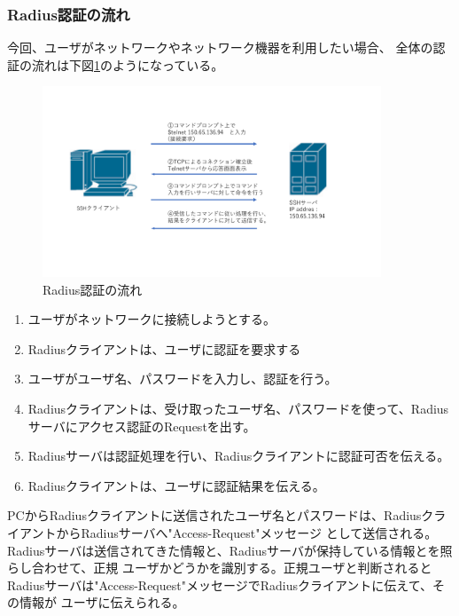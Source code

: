 \documentclass[11pt,a4j,titlepage]{jreport}
\begin{document}
\subsubsection*{Radius認証の流れ}
今回、ユーザがネットワークやネットワーク機器を利用したい場合、
全体の認証の流れは下図\ref{Radius_Authentication}のようになっている。
\begin{figure}[h]
    \begin{center}
        \includegraphics[width=0.9\textwidth, page=19]{graphs/network_archtecture.pdf}
        \caption{Radius認証の流れ}
        \label{Radius_Authentication}
    \end{center}
\end{figure}
\begin{enumerate}
    \setlength{\parskip}{0.1cm} %
    \setlength{\itemsep}{0.1cm} 

    \item ユーザがネットワークに接続しようとする。
    \item Radiusクライアントは、ユーザに認証を要求する
    \item ユーザがユーザ名、パスワードを入力し、認証を行う。
    \item Radiusクライアントは、受け取ったユーザ名、パスワードを使って、Radiusサーバにアクセス認証のRequestを出す。
    \item Radiusサーバは認証処理を行い、Radiusクライアントに認証可否を伝える。
    \item Radiusクライアントは、ユーザに認証結果を伝える。

\end{enumerate}




PCからRadiusクライアントに送信されたユーザ名とパスワードは、RadiusクライアントからRadiusサーバへ"Access-Request"メッセージ
として送信される。Radiusサーバは送信されてきた情報と、Radiusサーバが保持している情報とを照らし合わせて、正規
ユーザかどうかを識別する。正規ユーザと判断されるとRadiusサーバは"Access-Request"メッセージでRadiusクライアントに伝えて、その情報が
ユーザに伝えられる。
\\
\fi
\end{document}
